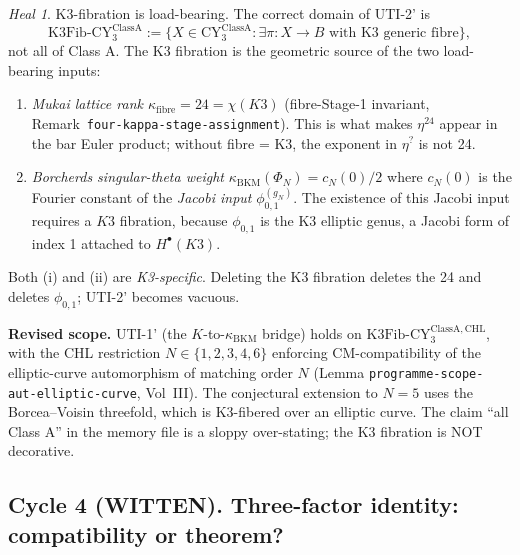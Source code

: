 \documentclass[11pt]{amsart}
\theoremstyle{definition}
\theoremstyle{remark}
\newtheorem{heal}[theorem]{Heal}
\newcommand{\CY}{\mathrm{CY}}
\newcommand{\kBKM}{\kappa_{\mathrm{BKM}}}
\newcommand{\kfiber}{\kappa_{\mathrm{fibre}}}
\begin{document}
\begin{heal}\label{heal:uti-k3fib-essentiality}
K3-fibration is load-bearing. The correct domain of UTI-2' is
\[
\mathrm{K3Fib}\text{-}\CY_3^{\mathrm{ClassA}}
:= \{X \in \CY_3^{\mathrm{ClassA}} : \exists \pi: X \to B \text{ with K3 generic fibre}\},
\]
not all of Class A. The K3 fibration is the geometric source of the two load-bearing inputs:
\begin{enumerate}[label=(\roman*)]
\item \emph{Mukai lattice rank $\kfiber = 24 = \chi(K3)$} (fibre-Stage-1 invariant,
Remark~\texttt{four-kappa-stage-assignment}). This is what makes $\eta^{24}$ appear in the bar
Euler product; without fibre = K3, the exponent in $\eta^{?}$ is not 24.
\item \emph{Borcherds singular-theta weight}
$\kBKM(\Phi_N) = c_N(0)/2$ where $c_N(0)$ is the Fourier constant of the
\emph{Jacobi input} $\phi_{0,1}^{(g_N)}$. The existence of this Jacobi input requires a $K3$
fibration, because $\phi_{0,1}$ is the K3 elliptic genus, a Jacobi form of index 1 attached
to $H^\bullet(K3)$.
\end{enumerate}
Both (i) and (ii) are \emph{K3-specific}. Deleting the K3 fibration deletes the 24 and deletes
$\phi_{0,1}$; UTI-2' becomes vacuous.

\textbf{Revised scope.} UTI-1' (the $K$-to-$\kBKM$ bridge) holds on
$\mathrm{K3Fib}\text{-}\CY_3^{\mathrm{ClassA},\mathrm{CHL}}$, with the CHL restriction $N \in \{1, 2, 3, 4, 6\}$
enforcing CM-compatibility of the elliptic-curve automorphism of matching order $N$ (Lemma
\texttt{programme-scope-aut-elliptic-curve}, Vol~III). The conjectural extension to $N = 5$
uses the Borcea--Voisin threefold, which is K3-fibered over an elliptic curve. The claim
``all Class A'' in the memory file is a sloppy over-stating; the K3 fibration is NOT decorative.
\end{heal}

\subsection{Cycle 4 (WITTEN). Three-factor identity: compatibility or theorem?}
\end{document}
